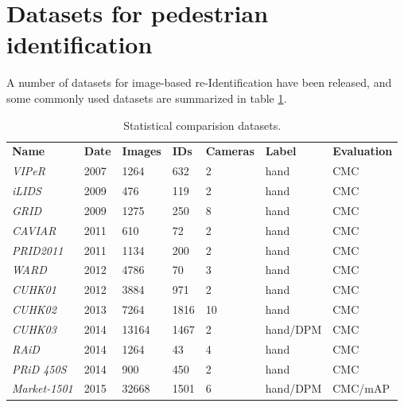 \section{Datasets for pedestrian identification}

A number of datasets for image-based re-Identification have been released, and some commonly used datasets are summarized in table \ref{tableID}. 


\begin{table}[H]
\centering

\begin{tabular}{lllllll}
\textbf{Name}        & \textbf{Date} & \textbf{Images} & \textbf{IDs} & \textbf{Cameras} & \textbf{Label} & \textbf{Evaluation} \\
\textit{VIPeR} \cite{viper}      & 2007          & 1264                      & 632          & 2                & hand           & CMC                 \\
\textit{iLIDS}  \cite{lids}      & 2009          & 476                       & 119          & 2                & hand           & CMC                 \\
\textit{GRID}   \cite{grid}     & 2009          & 1275                      & 250          & 8                & hand           & CMC                 \\
\textit{CAVIAR} \cite{caviar}      & 2011          & 610                       & 72           & 2                & hand           & CMC                 \\
\textit{PRID2011} \cite{prod11}   & 2011          & 1134                      & 200          & 2                & hand           & CMC                 \\
\textit{WARD}   \cite{ward}     & 2012          & 4786                      & 70           & 3                & hand           & CMC                 \\
\textit{CUHK01} \cite{cuk1}     & 2012          & 3884                      & 971          & 2                & hand           & CMC                 \\
\textit{CUHK02}  \cite{cuk2}    & 2013          & 7264                      & 1816         & 10               & hand           & CMC                 \\
\textit{CUHK03}  \cite{cuk3}    & 2014          & 13164                     & 1467         & 2                & hand/DPM       & CMC                 \\
\textit{RAiD}  \cite{raid}      & 2014          & 1264                      & 43           & 4                & hand           & CMC                 \\
\textit{PRiD 450S} \cite{prid450}   & 2014          & 900                       & 450          & 2                & hand           & CMC                 \\
\textit{Market-1501} \cite{market} & 2015          & 32668                     & 1501         & 6                & hand/DPM       & CMC/mAP            
\end{tabular}
\caption{Statistical comparision datasets.}
\label{tableID}
\end{table}

